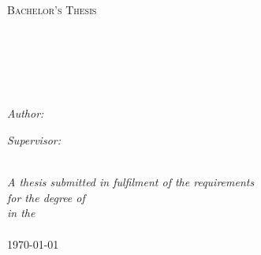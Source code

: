 \documentclass[11pt, a4paper, oneside]{Thesis} %
\begin{document}
\begin{titlepage}
\begin{center}
~\\
\textsc{\LARGE \univname}\\[1.5cm] %
~\\
\textsc{\Large Bachelor's Thesis}\\[0.5cm] %
~\\
~\\
{\huge \bfseries \ttitle}\\[0.4cm] %
~\\~\\

\begin{minipage}{0.4\textwidth}
\begin{flushleft} \large
\emph{Author:}\\
\href{http://www.johnsmith.com}{\authornames} %
\end{flushleft}
\end{minipage}
\begin{minipage}{0.4\textwidth}
\begin{flushright} \large
\emph{Supervisor:} \\
\href{}{\supname} %
\end{flushright}
\end{minipage}\\[3cm]
 
\large \textit{A thesis submitted in fulfilment of the requirements\\ for the degree of \degreename}\\[0.3cm] %
\textit{in the}\\[0.4cm]
\deptname\\[2cm] %
 
{\large \today}\\[4cm] %
 
\vfill
\end{center}

\end{titlepage}

\end{document}
